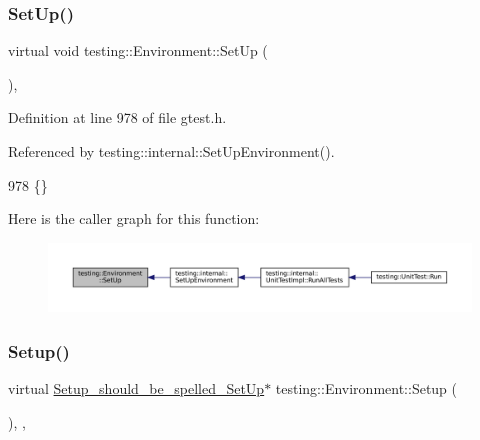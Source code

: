 \subsubsection{\texorpdfstring{Set\+Up()}{SetUp()}}
{\footnotesize\ttfamily virtual void testing\+::\+Environment\+::\+Set\+Up (\begin{DoxyParamCaption}{ }\end{DoxyParamCaption})\hspace{0.3cm}{\ttfamily [inline]}, {\ttfamily [virtual]}}



Definition at line 978 of file gtest.\+h.



Referenced by testing\+::internal\+::\+Set\+Up\+Environment().


\begin{DoxyCode}
978 \{\}
\end{DoxyCode}
Here is the caller graph for this function\+:
\nopagebreak
\begin{figure}[H]
\begin{center}
\leavevmode
\includegraphics[width=350pt]{classtesting_1_1Environment_a1bf8cafaa9d4eba9feb98655ee434eb3_icgraph}
\end{center}
\end{figure}
\mbox{\label{classtesting_1_1Environment_a6096a69b03f6eb727a69a39f854cc87b}} 
\subsubsection{\texorpdfstring{Setup()}{Setup()}}
{\footnotesize\ttfamily virtual \hyperlink{structtesting_1_1Environment_1_1Setup__should__be__spelled__SetUp}{Setup\+\_\+should\+\_\+be\+\_\+spelled\+\_\+\+Set\+Up}$\ast$ testing\+::\+Environment\+::\+Setup (\begin{DoxyParamCaption}{ }\end{DoxyParamCaption})\hspace{0.3cm}{\ttfamily [inline]}, {\ttfamily [private]}, {\ttfamily [virtual]}}




